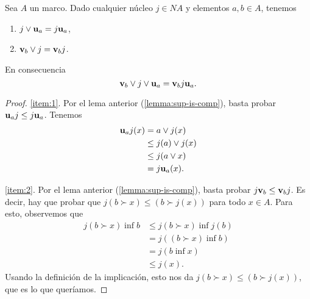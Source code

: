\begin{lemma}
  \label{lemma:sup-ab-cerr}
  Sea $A$ un marco.
  Dado cualquier núcleo $j\in NA$ y elementos $a,b\in A$, tenemos
  \begin{enumerate}
    \item\label{item:1} $j\vee\mathbf u_{a} = j\mathbf u_{a}$,
    \item\label{item:2} $\mathbf v_{b} \vee j = \mathbf v_{b} j$.
  \end{enumerate}
  En consecuencia
  \begin{equation}
    \mathbf v_{b} \vee j \vee \mathbf u_{a} = \mathbf v_{b} j \mathbf u_{a}
  .\end{equation}
\end{lemma}
\begin{proof}
  \ref{item:1}.
  Por el lema anterior (\ref{lemma:sup-is-comp}),
  basta probar $\mathbf u_{a} j \leq j\mathbf u_{a}$.
  Tenemos
  \begin{align}
    \mathbf u_{a} j (x)
    &= a\vee j(x) \\
    &\leq j(a)\vee j(x) \\
    &\leq j(a\vee x) \\
    &= j\mathbf u_{a}(x)
  .\end{align}
  
  \ref{item:2}.
  Por el lema anterior (\ref{lemma:sup-is-comp}), basta probar 
  $j\mathbf v_{b} \leq \mathbf v_{b} j$.
  Es decir, hay que probar que $j(b\succ x) \leq (b\succ j(x))$
  para todo $x\in A$.
  Para esto, observemos que
  \begin{align*}
    j(b\succ x) \inf b
    &\leq j(b\succ x) \inf j(b) \\
    &= j((b\succ x)\inf b) \\
    &= j(b\inf x) \\
    &\leq j(x).
  \end{align*}
  Usando la definición de la implicación, esto nos da $j(b\succ
  x) \leq (b\succ j(x))$, que es lo que queríamos.
\end{proof}


